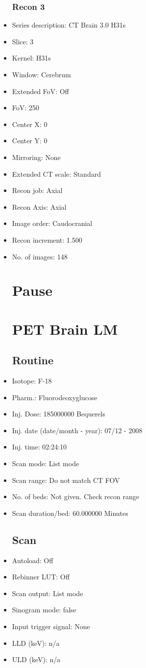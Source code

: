 \documentclass[12pt]{article}
\begin{document}
\begin{itemize}
\subsubsection{Recon 3}
\item Series description: CT Brain 3.0 H31s
\item Slice: 3
\item Kernel: H31s
\item Window: Cerebrum
\item Extended FoV: Off
\item FoV: 250
\item Center X: 0
\item Center Y: 0
\item Mirroring: None
\item Extended CT scale: Standard
\item Recon job: Axial
\item Recon Axis: Axial
\item Image order: Caudocranial
\item Recon increment: 1.500
\item No. of images: 148
\section{Pause}
\section{PET Brain LM}\subsection{Routine}
\item Isotope: F-18
\item Pharm.: Fluorodeoxyglucose
\item Inj. Dose: 185000000 Bequerels
\item Inj. date (date/month - year): 07/12 - 2008
\item Inj. time: 02:24:10
\item Scan mode: List mode
\item Scan range: Do not match CT FOV
\item No. of beds: Not given. Check recon range
\item Scan duration/bed: 60.000000 Minutes
\subsection{Scan}
\item Autoload: Off
\item Rebinner LUT: Off
\item Scan output: List mode
\item Sinogram mode: false
\item Input trigger signal: None
\item LLD (keV): n/a
\item ULD (keV): n/a

\end{itemize}
\end{document}
